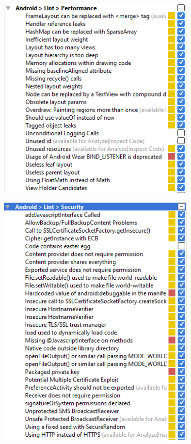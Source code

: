\begin{figure}[H]
  		\centering
      	\includegraphics[width=100mm]{Capture5}	      	
  		\caption{}
\end{figure}

\begin{figure}[H]
  		\centering
      	\includegraphics[width=100mm]{Capture6}	      	
  		\caption{}
\end{figure}

